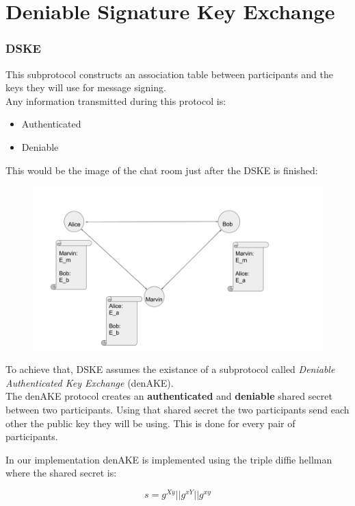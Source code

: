 \section{Deniable Signature Key Exchange}

\begin{frame}
  \frametitle{DSKE}
  This subprotocol constructs an association table between participants and the keys they will use for message signing.\\[0.3cm]

  Any information transmitted during this protocol is:

  \begin{itemize}
    \item Authenticated
    \item Deniable
  \end{itemize}

  This would be the image of the chat room just after the DSKE is finished:
  \begin{figure}
    \includegraphics[scale=0.2]{Figures/denAKE.png}
  \end{figure}
\end{frame}

\begin{frame}
  To achieve that, DSKE assumes the existance of a subprotocol called \emph{Deniable Authenticated Key Exchange} (denAKE).\\[0.3cm]

  The denAKE protocol creates an {\bf authenticated} and {\bf deniable} shared secret between two participants. Using that shared secret the two participants send each other the public key they will be using. This is done for every pair of participants.\\[0.3cm]

  \begin{minipage}{.47\textwidth}
    In our implementation denAKE is implemented using the triple diffie hellman where the shared secret is:

    \[
      s = g^{Xy} || g^{xY} || g^{xy}
    \]

  \end{minipage}
  \begin{minipage}{.47\textwidth}
     \begin{figure}
      \scalebox{0.5}{ }
    \end{figure}
  \end{minipage}
\end{frame}
